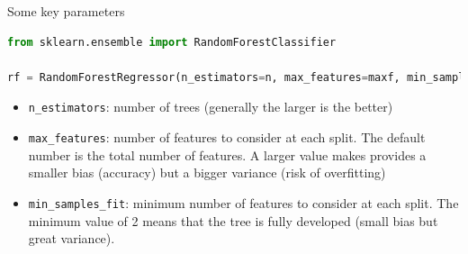 \documentclass[handout]{beamer}
\begin{document}
\begin{frame}[fragile]{Some key parameters}
\begin{lstlisting}[language=Python]
from sklearn.ensemble import RandomForestClassifier

rf = RandomForestRegressor(n_estimators=n, max_features=maxf, min_samples_split=min_split,...)
\end{lstlisting}
\vspace{-1.5em}
\begin{itemize}[<+->]
    \item \verb|n_estimators|: number of trees (generally the larger is the better)
    \item   \verb|max_features|: number of features to consider at each split. The default number is the total number of features. A larger value makes provides a smaller bias (accuracy) but a bigger variance (risk of overfitting)
      \item \verb|min_samples_fit|: minimum number of features to consider at each split. The minimum value of 2 means that the tree is fully developed (small bias but great variance).
\end{itemize}

\end{frame}
\end{document}
